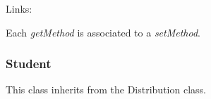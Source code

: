 \begin{description}
\item[Links:]  \rule{0pt}{1em}
\end{description}

Each  \textit{getMethod}  is associated to a \textit{setMethod}.




\newpage
\subsubsection{Student}

This class inherits from the Distribution class.

